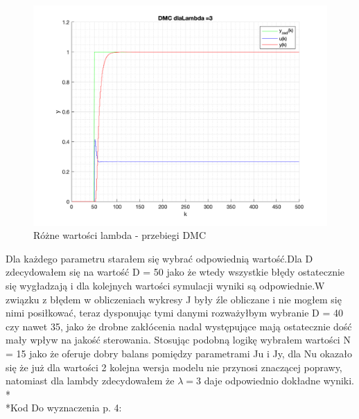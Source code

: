 \documentclass[a4paper, 11pt]{article}
\begin{document}
\begin{enumerate}
 \begin{figure} [H]
\centering
  \includegraphics[width=\linewidth]{./ModelsP4_lambda/P4_DMC_lambda_3_png.png} 
 \caption[Różne wartości lambda - przebiegi DMC]
{Różne wartości lambda - przebiegi DMC}
 \end{figure}
\newpage
Dla każdego parametru starałem się wybrać odpowiednią wartość.Dla D zdecydowałem się na wartość D = 50 jako że wtedy wszystkie błędy ostatecznie się wygładzają i dla kolejnych wartości symulacji wyniki są odpowiednie.W związku z błędem w obliczeniach wykresy J były źle obliczane i nie mogłem się nimi posiłkować, teraz dysponując tymi danymi rozważyłbym wybranie D = 40 czy nawet 35, jako że drobne zakłócenia nadal występujące mają ostatecznie dość mały wpływ na jakość sterowania. Stosując podobną logikę wybrałem wartości N = 15 jako że oferuje dobry balans pomiędzy parametrami Ju i Jy, dla Nu okazało się że już dla wartości 2 kolejna wersja modelu nie przynosi znaczącej poprawy, natomiast dla lambdy zdecydowałem że \( \lambda = 3 \) daje odpowiednio dokładne wyniki.
\\* \\*Kod Do wyznaczenia p. 4: \\

 
 
 
 


\end{enumerate}
\end{document}
